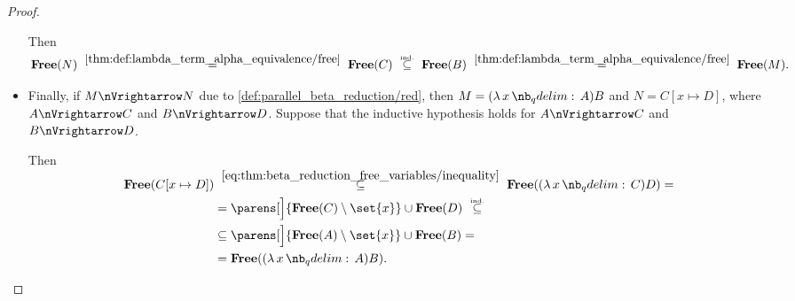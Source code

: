\begin{proof}
\begin{itemize}
    Then
    \begin{equation*}
      \op*{Free}(N)
      \reloset {\ref{thm:def:lambda_term_alpha_equivalence/free}} =
      \op*{Free}(C)
      \reloset {\T{ind.}} \subseteq
      \op*{Free}(B)
      \reloset {\ref{thm:def:lambda_term_alpha_equivalence/free}} =
      \op*{Free}(M).
    \end{equation*}

    \item Finally, if \( M \pred N \) due to \ref{def:parallel_beta_reduction/red}, then \( M = (\qabs x A)B \) and \( N = C[x \mapsto D] \), where \( A \pred C \) and \( B \pred D \). Suppose that the inductive hypothesis holds for \( A \pred C \) and \( B \pred D \).

    Then
    \begin{align*}
      \op*{Free}(C[x \mapsto D])
      &\reloset {\eqref{eq:thm:beta_reduction_free_variables/inequality}} \subseteq
      \op*{Free}((\qabs x C) D)
      = \\ &=
      \parens[\Big]{ \op*{Free}(C) \setminus \set{ x } } \cup \op*{Free}(D)
      \reloset {\T{ind.}} \subseteq \\ &\subseteq
      \parens[\Big]{ \op*{Free}(A) \setminus \set{ x } } \cup \op*{Free}(B)
      = \\ &=
      \op*{Free}((\qabs x A) B).
    \end{align*}
  \end{itemize}
\end{proof}

